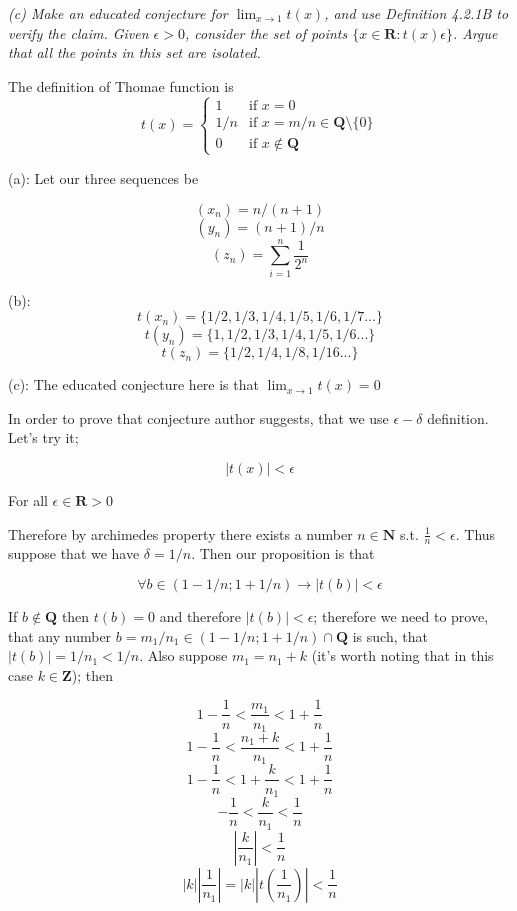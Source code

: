 \documentclass[11pt,oneside,titlepage]{book}
\begin{document}
\textit{(c) Make an educated conjecture for $\lim_{x\to1} t(x)$, and use Definition 4.2.1B
  to verify the claim. Given $\epsilon > 0$, consider the set of points
$\{x \in \textbf{R} : t(x)  \epsilon\}$.  Argue that all the points in this set are isolated.}


The definition of  Thomae function is
\begin{equation}
t(x)=
    \begin{cases}
      1 & \text{if } x = 0\\
      1/n & \text {if } x = m/n \in \textbf{Q} \text{\textbackslash} \{0\} \\
      0 & \text{if } x \notin \textbf{Q}
    \end{cases}
\end{equation}

(a): Let our three sequences be

$$ (x_n) = n/(n + 1)$$
$$ (y_n) = (n + 1)/n$$
$$ (z_n) = \sum_{i=1}^{n}{\frac{1}{2^n}}$$

(b):
$$t(x_n) = \{1/2, 1/3, 1/4, 1/5, 1/6, 1/7 ...\}$$
$$t(y_n) = \{1, 1/2, 1/3, 1/4, 1/5, 1/6 ...\}$$
$$t(z_n) = \{1/2, 1/4, 1/8, 1/16 ...\}$$

(c): The educated conjecture here is that $\lim_{x \to 1} t(x) = 0$

In order to prove that conjecture author suggests, that we use $\epsilon-\delta$ definition. Let's try
it;

$$ |t(x)| < \epsilon$$

For all $\epsilon \in \textbf{R} > 0$

Therefore by archimedes property there exists a number $n \in \textbf{N}$ s.t. $\frac{1}{n} < \epsilon$.
Thus suppose that we have $\delta = 1/n$. Then our proposition is that 

$$\forall b \in (1 - 1/n; 1 + 1/n) \to |t(b)| < \epsilon$$

If $b \notin \textbf{Q} $ then $t(b) = 0$ and therefore $|t(b)| < \epsilon$; therefore we need to prove,
that any number $b = m_1/n_1 \in (1 - 1/n; 1 + 1/n) \cap \textbf{Q}$ is such, that $|t(b)| = 1/n_1 < 1/n$.
Also suppose $m_1 = n_1 + k$ (it's worth noting that in this case $k \in \textbf{Z}$); then

$$ 1 - \frac{1}{n} < \frac{m_1}{n_1} < 1 + \frac{1}{n}$$
$$ 1 - \frac{1}{n} < \frac{n_1 + k}{n_1} < 1 + \frac{1}{n}$$
$$ 1 - \frac{1}{n} < 1 + \frac{k}{n_1} < 1 + \frac{1}{n}$$
$$ - \frac{1}{n} <  \frac{k}{n_1} <  \frac{1}{n}$$
$$ |\frac{k}{n_1}| <  \frac{1}{n}$$
$$ |k||\frac{1}{n_1}| = |k||t(\frac{1}{n_1})| <  \frac{1}{n}$$
\end{document}
